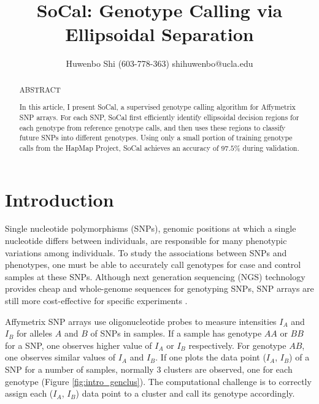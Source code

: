 \documentclass{scrartcl}
\begin{document}
\title{\LARGE SoCal: Genotype Calling via Ellipsoidal Separation}
\author{\large Huwenbo Shi (603-778-363) shihuwenbo@ucla.edu}
\date{}
\maketitle


\begin{abstract}
    \begin{center}
        ABSTRACT
    \end{center}
    
\par
In this article, I present SoCal, a supervised genotype calling algorithm for
Affymetrix SNP arrays.
For each SNP, SoCal first efficiently identify ellipsoidal decision regions for
each genotype from reference genotype calls, and then uses these regions to
classify future SNPs into different genotypes.
Using only a small portion of training genotype calls from the HapMap Project,
SoCal achieves an accuracy of $97.5\%$ during validation.
\end{abstract}


\section{Introduction}

\par
Single nucleotide polymorphisms (SNPs), genomic positions at which a single
nucleotide differs between individuals, are responsible for many phenotypic
variations among individuals.
To study the associations between SNPs and phenotypes, one must be able to
accurately call genotypes for case and control samples at these SNPs.
Although next generation sequencing (NGS) technology provides cheap and
whole-genome sequences for genotyping SNPs, SNP arrays are still more
cost-effective for specific experiments \cite{rho2010}.

\par
Affymetrix SNP arrays use oligonucleotide probes to measure intensities
$I_A$ and $I_B$ for alleles $A$ and $B$ of SNPs in samples.
If a sample has genotype $AA$ or $BB$ for a SNP, one observes higher value of
$I_A$ or $I_B$ respectively.
For genotype $AB$, one observes similar values of $I_A$ and $I_B$.
If one plots the data point ($I_A$, $I_B$) of a SNP for a number of samples,
normally 3 clusters are observed, one for each genotype
(Figure \ref{fig:intro_genclus}).
The computational challenge is to correctly assign each ($I_A$, $I_B$)
data point to a cluster and call its genotype accordingly.
\end{document}

